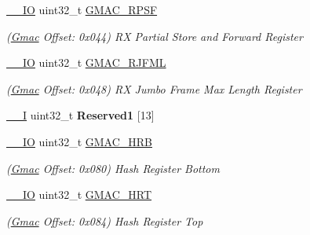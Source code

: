 \begin{DoxyCompactItemize}
\mbox{\label{structGmac_aba6afa3d0e58d716550ef09e75b305ac}} 
\mbox{\hyperlink{core__cm7_8h_aec43007d9998a0a0e01faede4133d6be}{\+\_\+\+\_\+\+IO}} uint32\+\_\+t \mbox{\hyperlink{structGmac_aba6afa3d0e58d716550ef09e75b305ac}{G\+M\+A\+C\+\_\+\+R\+P\+SF}}
\begin{DoxyCompactList}\small\item\em (\mbox{\hyperlink{structGmac}{Gmac}} Offset\+: 0x044) RX Partial Store and Forward Register \end{DoxyCompactList}\item 
\mbox{\label{structGmac_a72681c6da9cb352c31022a82aa20bcbb}} 
\mbox{\hyperlink{core__cm7_8h_aec43007d9998a0a0e01faede4133d6be}{\+\_\+\+\_\+\+IO}} uint32\+\_\+t \mbox{\hyperlink{structGmac_a72681c6da9cb352c31022a82aa20bcbb}{G\+M\+A\+C\+\_\+\+R\+J\+F\+ML}}
\begin{DoxyCompactList}\small\item\em (\mbox{\hyperlink{structGmac}{Gmac}} Offset\+: 0x048) RX Jumbo Frame Max Length Register \end{DoxyCompactList}\item 
\mbox{\label{structGmac_adb71c72926a58ba811efb2b55dd3bc73}} 
\mbox{\hyperlink{core__cm7_8h_af63697ed9952cc71e1225efe205f6cd3}{\+\_\+\+\_\+I}} uint32\+\_\+t {\bfseries Reserved1} \mbox{[}13\mbox{]}
\item 
\mbox{\label{structGmac_a574874505d501e7a367cd1a12dae0d6d}} 
\mbox{\hyperlink{core__cm7_8h_aec43007d9998a0a0e01faede4133d6be}{\+\_\+\+\_\+\+IO}} uint32\+\_\+t \mbox{\hyperlink{structGmac_a574874505d501e7a367cd1a12dae0d6d}{G\+M\+A\+C\+\_\+\+H\+RB}}
\begin{DoxyCompactList}\small\item\em (\mbox{\hyperlink{structGmac}{Gmac}} Offset\+: 0x080) Hash Register Bottom \end{DoxyCompactList}\item 
\mbox{\label{structGmac_a78f1b5aafa930b292fd0c6bc37e68302}} 
\mbox{\hyperlink{core__cm7_8h_aec43007d9998a0a0e01faede4133d6be}{\+\_\+\+\_\+\+IO}} uint32\+\_\+t \mbox{\hyperlink{structGmac_a78f1b5aafa930b292fd0c6bc37e68302}{G\+M\+A\+C\+\_\+\+H\+RT}}
\begin{DoxyCompactList}\small\item\em (\mbox{\hyperlink{structGmac}{Gmac}} Offset\+: 0x084) Hash Register Top \end{DoxyCompactList}\item 

\end{DoxyCompactItemize}
